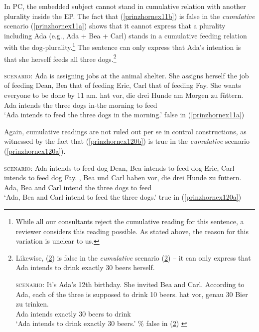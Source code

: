 \documentclass[output=paper]{langscibook}
\begin{document}
In PC, the embedded subject cannot stand in cumulative relation with another plurality inside the EP. The fact that (\ref{prinzhornex11b}) is false in the \textit{cumulative} scenario (\ref{prinzhornex11a}) shows that it cannot express that a plurality including Ada (e.g., Ada + Bea + Carl) stands in a cumulative feeding relation with the dog-plurality.\footnote{While all our consultants reject the cumulative reading for this sentence, a reviewer considers this reading possible. As stated above, the reason for this variation is unclear to us.} The sentence can only express that Ada's intention is that she herself feeds all three dogs.\footnote{Likewise, (\ref{prinzhornex12b}) is false in the \textit{cumulative} scenario (\ref{prinzhornex12a}) -- it can only express that Ada intends to drink exactly 30 beers herself. 

\ea 
\ea \label{prinzhornex12a} \textsc{scenario:} It's Ada's 12th birthday. She invited Bea and Carl. According to Ada, each of the three is supposed to drink 10 beers.
\ex {} {hat} {vor}, {genau} {30} {Bier} {zu} {trinken}.\\
   Ada intends {} exactly 30 beers to drink \\
   \glt `Ada intends to drink exactly 30 beers.' \hfill {$\%$ false} in (\ref{prinzhornex12a})  \label{prinzhornex12b}
\z \z

}

\ea \label{prinzhornex11}
\ea \label{prinzhornex11a} \textsc{scenario:} Ada is assigning jobs at the animal shelter. She assigns herself the job of feeding Dean,  Bea that of feeding  Eric,  Carl that of feeding  Fay. She wants everyone to be done by 11 am. 
\ex {} {hat vor}, {die} {drei} {Hunde} {am} {Morgen} {zu} {füttern}.\\
   Ada intends  the three dogs in-the morning to feed \\
   \glt `Ada intends to feed the three dogs in the morning.' \hfill {false} in (\ref{prinzhornex11a}) \label{prinzhornex11b}
\z \z

Again, cumulative readings are not ruled out per se in control constructions, as witnessed by the fact that (\ref{prinzhornex120b}) is true in the \textit{cumulative} scenario (\ref{prinzhornex120a}).

\ea \label{prinzhornex120}
\ea \label{prinzhornex120a} \textsc{scenario:}  Ada intends to feed dog Dean, Bea intends to feed dog Eric, Carl intends to feed dog Fay.
\ex {}, {Bea} {und} {Carl} {haben vor}, {die} {drei} {Hunde}  {zu} {füttern}.\\
   Ada, Bea and Carl intend  the three dogs  to feed \\
   \glt `Ada, Bea and Carl intend to feed the three dogs.' \hfill {true} in (\ref{prinzhornex120a}) \label{prinzhornex120b}
\z \z
\end{document}

